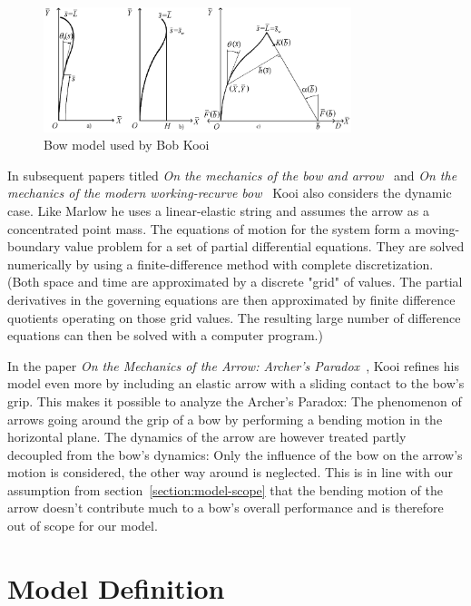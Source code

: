 \begin{figure}[h]
\centering
\includegraphics[width=0.8\textwidth]{figures/model/kooi}
\caption{Bow model used by Bob Kooi \cite{bib:kosp80}}
\label{fig:model:kooi}
\end{figure}

In subsequent papers titled \textit{On the mechanics of the bow and arrow}~\cite{bib:kooi81} and \textit{On the mechanics of the modern working-recurve bow}~\cite{bib:kooi91} Kooi also considers the dynamic case. Like Marlow he uses a linear-elastic string and assumes the arrow as a concentrated point mass. The equations of motion for the system form a moving-boundary value problem for a set of partial differential equations. They are solved numerically by using a finite-difference method with complete discretization. (Both space and time are approximated by a discrete "grid" of values. The partial derivatives in the governing equations are then approximated by finite difference quotients operating on those grid values. The resulting large number of difference equations can then be solved with a computer program.)

In the paper \textit{On the Mechanics of the Arrow: Archer's Paradox}~\cite{bib:kosp97}, Kooi refines his model even more by including an elastic arrow with a sliding contact to the bow's grip. This makes it possible to analyze the Archer's Paradox: The phenomenon of arrows going around the grip of a bow by performing a bending motion in the horizontal plane. The dynamics of the arrow are however treated partly decoupled from the bow's dynamics: Only the influence of the bow on the arrow's motion is considered, the other way around is neglected. This is in line with our assumption from section~\ref{section:model-scope} that the bending motion of the arrow doesn't contribute much to a bow's overall performance and is therefore out of scope for our model.

\section{Model Definition}

